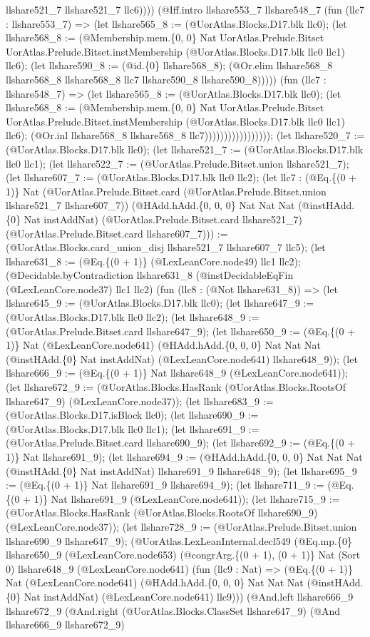 \documentclass[11pt]{article}
\begin{document}
llshare521\_7 llshare521\_7 llc6)))) (@Iff.intro llshare553\_7 llshare548\_7 (fun (llc7 : llshare553\_7) => (let llshare565\_8 := (@UorAtlas.Blocks.D17.blk llc0); (let llshare568\_8 := (@Membership.mem.\{0, 0\} Nat UorAtlas.Prelude.Bitset UorAtlas.Prelude.Bitset.instMembership (@UorAtlas.Blocks.D17.blk llc0 llc1) llc6); (let llshare590\_8 := (@id.\{0\} llshare568\_8); (@Or.elim llshare568\_8 llshare568\_8 llshare568\_8 llc7 llshare590\_8 llshare590\_8))))) (fun (llc7 : llshare548\_7) => (let llshare565\_8 := (@UorAtlas.Blocks.D17.blk llc0); (let llshare568\_8 := (@Membership.mem.\{0, 0\} Nat UorAtlas.Prelude.Bitset UorAtlas.Prelude.Bitset.instMembership (@UorAtlas.Blocks.D17.blk llc0 llc1) llc6); (@Or.inl llshare568\_8 llshare568\_8 llc7))))))))))))))))); (let llshare520\_7 := (@UorAtlas.Blocks.D17.blk llc0); (let llshare521\_7 := (@UorAtlas.Blocks.D17.blk llc0 llc1); (let llshare522\_7 := (@UorAtlas.Prelude.Bitset.union llshare521\_7); (let llshare607\_7 := (@UorAtlas.Blocks.D17.blk llc0 llc2); (let llc7 : (@Eq.\{(0 + 1)\} Nat (@UorAtlas.Prelude.Bitset.card (@UorAtlas.Prelude.Bitset.union llshare521\_7 llshare607\_7)) (@HAdd.hAdd.\{0, 0, 0\} Nat Nat Nat (@instHAdd.\{0\} Nat instAddNat) (@UorAtlas.Prelude.Bitset.card llshare521\_7) (@UorAtlas.Prelude.Bitset.card llshare607\_7))) := (@UorAtlas.Blocks.card\_union\_disj llshare521\_7 llshare607\_7 llc5); (let llshare631\_8 := (@Eq.\{(0 + 1)\} (@LexLeanCore.node49) llc1 llc2); (@Decidable.byContradiction llshare631\_8 (@instDecidableEqFin (@LexLeanCore.node37) llc1 llc2) (fun (llc8 : (@Not llshare631\_8)) => (let llshare645\_9 := (@UorAtlas.Blocks.D17.blk llc0); (let llshare647\_9 := (@UorAtlas.Blocks.D17.blk llc0 llc2); (let llshare648\_9 := (@UorAtlas.Prelude.Bitset.card llshare647\_9); (let llshare650\_9 := (@Eq.\{(0 + 1)\} Nat (@LexLeanCore.node641) (@HAdd.hAdd.\{0, 0, 0\} Nat Nat Nat (@instHAdd.\{0\} Nat instAddNat) (@LexLeanCore.node641) llshare648\_9)); (let llshare666\_9 := (@Eq.\{(0 + 1)\} Nat llshare648\_9 (@LexLeanCore.node641)); (let llshare672\_9 := (@UorAtlas.Blocks.HasRank (@UorAtlas.Blocks.RootsOf llshare647\_9) (@LexLeanCore.node37)); (let llshare683\_9 := (@UorAtlas.Blocks.D17.isBlock llc0); (let llshare690\_9 := (@UorAtlas.Blocks.D17.blk llc0 llc1); (let llshare691\_9 := (@UorAtlas.Prelude.Bitset.card llshare690\_9); (let llshare692\_9 := (@Eq.\{(0 + 1)\} Nat llshare691\_9); (let llshare694\_9 := (@HAdd.hAdd.\{0, 0, 0\} Nat Nat Nat (@instHAdd.\{0\} Nat instAddNat) llshare691\_9 llshare648\_9); (let llshare695\_9 := (@Eq.\{(0 + 1)\} Nat llshare691\_9 llshare694\_9); (let llshare711\_9 := (@Eq.\{(0 + 1)\} Nat llshare691\_9 (@LexLeanCore.node641)); (let llshare715\_9 := (@UorAtlas.Blocks.HasRank (@UorAtlas.Blocks.RootsOf llshare690\_9) (@LexLeanCore.node37)); (let llshare728\_9 := (@UorAtlas.Prelude.Bitset.union llshare690\_9 llshare647\_9); (@UorAtlas.LexLeanInternal.decl549 (@Eq.mp.\{0\} llshare650\_9 (@LexLeanCore.node653) (@congrArg.\{(0 + 1), (0 + 1)\} Nat (Sort 0) llshare648\_9 (@LexLeanCore.node641) (fun (llc9 : Nat) => (@Eq.\{(0 + 1)\} Nat (@LexLeanCore.node641) (@HAdd.hAdd.\{0, 0, 0\} Nat Nat Nat (@instHAdd.\{0\} Nat instAddNat) (@LexLeanCore.node641) llc9))) (@And.left llshare666\_9 llshare672\_9 (@And.right (@UorAtlas.Blocks.ClassSet llshare647\_9) (@And llshare666\_9 llshare672\_9) 
\end{document}
